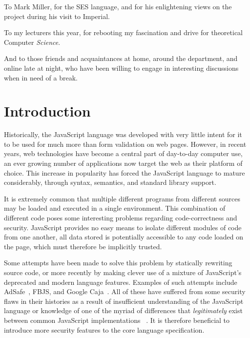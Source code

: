 \documentclass[a4paper,notitlepage]{report}
\begin{document}
  To Mark Miller, for the SES language, and for his enlightening views on the
  project during his visit to Imperial.

  To my lecturers this year, for rebooting my fascination and drive for
  theoretical Computer \emph{Science}.

  And to those friends and acquaintances at home, around the department, and
  online late at night, who have been willing to engage in interesting
  discussions when in need of a break.

\tableofcontents

\chapter{Introduction}


  Historically, the JavaScript language was developed with very little intent
  for it to be used for much more than form validation on web pages.
  However, in recent years, web technologies have become a central part of
  day-to-day computer use, an ever growing number of applications now target the
  web as their platform of choice.
  This increase in popularity has forced the JavaScript language to mature
  considerably, through syntax, semantics, and standard library support.

  It is extremely common
  that multiple different programs from different sources may be loaded and
  executed in a single environment. This combination of different code poses
  some interesting problems regarding code-correctness and security. JavaScript
  provides no easy means to isolate different modules of code from one another,
  all data stored is potentially accessible to any code loaded on the page,
  which must therefore be implicitly trusted.

  Some attempts have been made to solve this problem by statically rewriting
  source code, or more recently by making clever use of
  a mixture of JavaScript's deprecated and modern language features.
  Examples of such attempts include AdSafe~\cite{AdSafe}, FBJS, and
  Google Caja~\cite{miller2008caja}.
  All of these have suffered from some security
  flaws in their histories as a
  result of insufficient understanding of the JavaScript language or knowledge
  of one of the myriad of differences that \emph{legitimately} exist between
  common JavaScript implementations~
  \cite{maffeis2009jsisolation, maffeis2010object-cap, ses-semantics}.
  It is therefore beneficial to introduce more security features to the core
  language specification.
\end{document}
